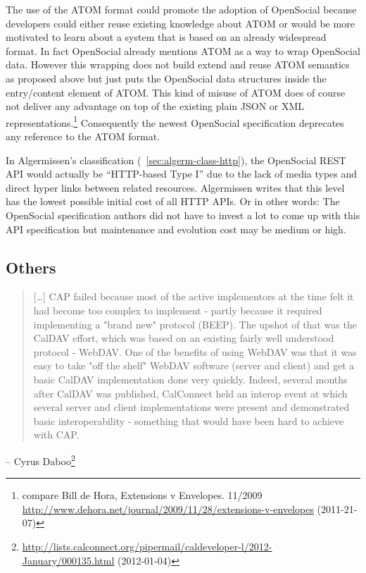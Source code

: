 \documentclass[12pt,a4paper]{scrartcl}		%
\newcommand{\citeurl}[2]{\url{#1} (#2)}
\begin{document}
The use of the ATOM format could promote the adoption of OpenSocial because
developers could either reuse existing knowledge about ATOM or would be more
motivated to learn about a system that is based on an already widespread
format. In fact OpenSocial already mentions ATOM as a way to wrap OpenSocial
data. However this wrapping does not build extend and reuse ATOM semantics as
proposed above but just puts the OpenSocial data structures inside the
entry/content element of ATOM. This kind of misuse of ATOM does of course not
deliver any advantage on top of the existing plain JSON or XML
representations.\footnote{compare Bill de Hora, Extensions v Envelopes. 11/2009 
  \citeurl{http://www.dehora.net/journal/2009/11/28/extensions-v-envelopes}{2011-21-07}}
Consequently the newest OpenSocial specification deprecates any reference to the
ATOM format.

In Algermissen's classification (~\ref{sec:algerm-class-http}), the OpenSocial
REST API would actually be ``HTTP-based Type I'' due to the lack of media types
and direct hyper links between related resources. Algermissen writes that this
level has the lowest possible initial cost of all HTTP APIs. Or in other words:
The OpenSocial specification authors did not have to invest a lot to come up
with this API specification but maintenance and evolution cost may be medium or
high.

\subsection{Others}

\begin{quotation}
  [\ldots] CAP failed because most of the active implementors at the 
time felt it had become too complex to implement - partly because it 
required implementing a "brand new" protocol (BEEP). The upshot of that was 
the CalDAV effort, which was based on an existing fairly well understood 
protocol - WebDAV. One of the benefits of using WebDAV was that it was easy 
to take "off the shelf" WebDAV software (server and client) and get a basic 
CalDAV implementation done very quickly. Indeed, several months after 
CalDAV was published, CalConnect held an interop event at which several 
server and client implementations were present and demonstrated basic 
interoperability - something that would have been hard to achieve with CAP.
\end{quotation}
-- Cyrus Daboo\footnote{\citeurl{http://lists.calconnect.org/pipermail/caldeveloper-l/2012-January/000135.html}{2012-01-04}}
\end{document}
